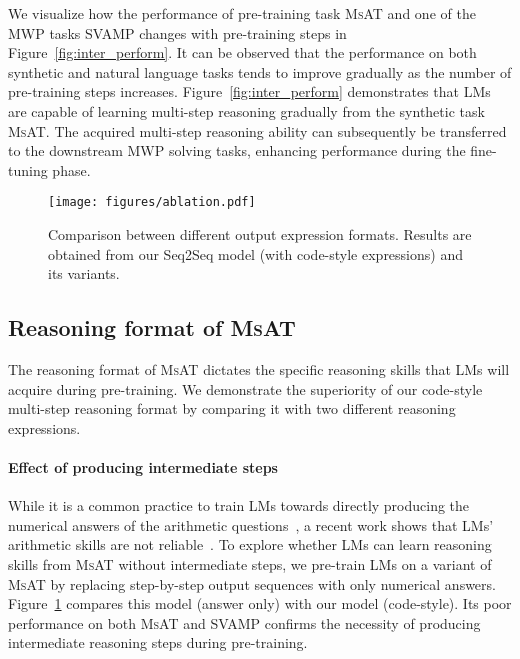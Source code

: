 \documentclass[11pt]{article}
\begin{document}
      We visualize how the performance of pre-training task \textsc{MsAT} and one of the MWP tasks SVAMP changes with pre-training steps in Figure~\ref{fig:inter_perform}.
It can be observed that the performance on both synthetic and natural language tasks tends to improve gradually as the number of pre-training steps increases.
Figure~\ref{fig:inter_perform} demonstrates that LMs are capable of learning multi-step reasoning gradually from the synthetic task \textsc{MsAT}.
The acquired multi-step reasoning ability can subsequently be transferred to the downstream MWP solving tasks, 
        enhancing performance during the fine-tuning phase.


\begin{figure}[t]
    \captionsetup{type=figure}
    \centering
    \texttt{[image: figures/ablation.pdf]}
\caption{
        \label{fig:ablation}
Comparison between different output expression formats.
Results are obtained from our Seq2Seq model (with code-style expressions) and its variants.
    }
\end{figure}


  \subsection{Reasoning format of \textsc{MsAT}}

    The reasoning format of \textsc{MsAT} dictates the specific reasoning skills that LMs will acquire during pre-training.
We demonstrate the superiority of our code-style multi-step reasoning format by comparing it with two different reasoning expressions.


    \paragraph{Effect of producing intermediate steps}
While it is a common practice to train LMs 
        towards directly producing the numerical answers of the arithmetic questions~\cite{geva2020genbert,pi2022poet},
a recent work shows that LMs' arithmetic skills are not reliable~\cite{razeghi2022impact}.
To explore whether LMs can learn reasoning skills from \textsc{MsAT} without intermediate steps,
        we pre-train LMs on a variant of \textsc{MsAT} by replacing step-by-step output sequences with only numerical answers.
Figure~\ref{fig:ablation} compares this model (answer only) with our model (code-style).
Its poor performance on both \textsc{MsAT} and SVAMP confirms the necessity of producing intermediate reasoning steps during pre-training.
    
\end{document}
